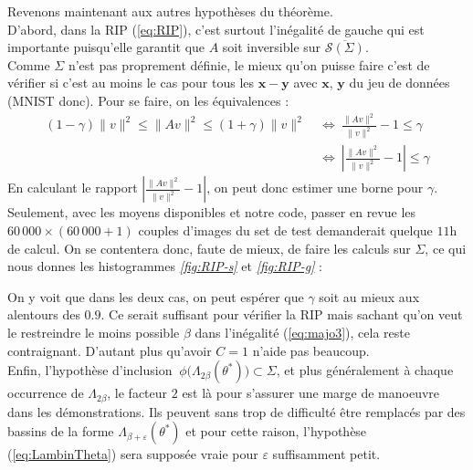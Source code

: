 \documentclass[hidelinks, french]{article} %
\newcommand{\Llr}{\Longleftrightarrow}
\renewcommand{\epsilon}{\varepsilon}
\renewcommand{\leq}{\leqslant}
\renewcommand{\bf}[1]{\boldsymbol{#1}}
\theoremstyle{enonce}
\theoremstyle{special}
\theoremstyle{rq}
\theoremstyle{exo}
\theoremstyle{demo}
\begin{document}
Revenons maintenant aux autres hypothèses du théorème.
\\
D'abord, dans la RIP (\ref{eq:RIP}), c'est surtout l'inégalité de gauche qui est importante puisqu'elle garantit que $A$ soit inversible sur $\overline{\mathcal{S}(\Sigma)}$.
\\
Comme $\Sigma$ n'est pas proprement définie, le mieux qu'on puisse faire c'est de vérifier si c'est au moins le cas pour tous les $\bf{x}-\bf{y}$ avec $\bf{x}$, $\bf{y}$ du jeu de données (MNIST donc). Pour se faire, on les équivalences :
\begin{align*}(1-\gamma)\|v\|^2\leq \|Av\|^2\leq (1+\gamma)\|v\|^2\ &\Llr\ \frac{\|Av\|^2}{\|v\|^2}-1\leq \gamma\\
	&\Llr\ \left|\frac{\|Av\|^2}{\|v\|^2}-1\right|\leq \gamma\end{align*}
En calculant le rapport $\left|\frac{\|Av\|^2}{\|v\|^2}-1\right|$, on peut donc estimer une borne pour $\gamma$. Seulement, avec les moyens disponibles et notre code, passer en revue les $60\,000\times(60\,000+1)$ couples d'images du set de test demanderait quelque $11$h de calcul. On se contentera donc, faute de mieux, de faire les calculs sur $\Sigma$, ce qui nous donnes les histogrammes \textit{\ref{fig:RIP-s}} et \textit{\ref{fig:RIP-g}} :
\\

\begin{figure}[h]
	\begin{floatrow}
		{
		}
		
		{
		}
\end{floatrow}\end{figure}

\noindent On y voit que dans les deux cas, on peut espérer que $\gamma$ soit au mieux aux alentours des $0.9$. Ce serait suffisant pour vérifier la RIP mais sachant qu'on veut le restreindre le moins possible $\beta$ dans l'inégalité (\ref{eq:majo3}), cela reste contraignant. D'autant plus qu'avoir $C=1$ n'aide pas beaucoup.
\\

Enfin, l'hypothèse d'inclusion $\ \phi\big(\Lambda_{2\beta}(\theta^*)\big)\subset\Sigma$, et plus généralement à chaque occurrence de $\Lambda_{2\beta}$, le facteur $2$ est là pour s'assurer une marge de manoeuvre dans les démonstrations. Ils peuvent sans trop de difficulté être remplacés par des bassins de la forme $\Lambda_{\beta+\epsilon}(\theta^*)$ et pour cette raison, l’hypothèse (\ref{eq:LambinTheta}) sera supposée vraie pour $\epsilon$ suffisamment petit.
\\
\end{document}
